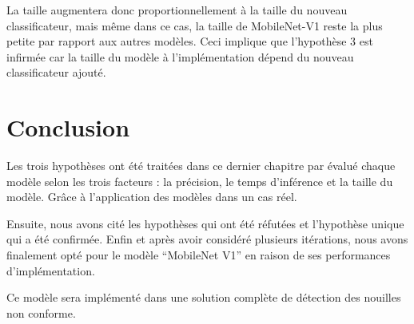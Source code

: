     La taille augmentera donc proportionnellement à la taille du nouveau classificateur, mais même dans ce cas, la taille de MobileNet-V1 reste la plus petite par rapport aux autres modèles. Ceci implique que l'hypothèse 3 est infirmée car la taille du modèle à l'implémentation dépend du nouveau classificateur ajouté. 
    
    \newpage
    \section{Conclusion}
    Les trois hypothèses ont été traitées dans ce dernier chapitre par évalué chaque modèle selon les trois facteurs : la précision, le temps d'inférence et la taille du modèle. Grâce à l'application des modèles dans un cas réel. 

Ensuite, nous avons cité les hypothèses qui ont été réfutées et l'hypothèse unique qui a été confirmée. Enfin et après avoir considéré plusieurs itérations, nous avons finalement opté pour le modèle “MobileNet V1” en raison de ses performances d'implémentation. 

Ce modèle sera implémenté dans une solution complète de détection des nouilles non conforme. 

